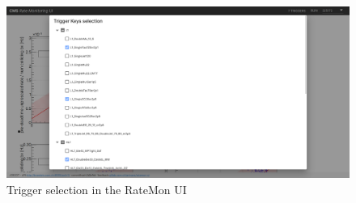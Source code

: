 \begin{figure}
    \centerline{
        \includegraphics[width=0.9\paperwidth]{figures/ratemon-ui1.png}}
    \caption{Trigger selection in the RateMon UI}
    \label{fig:ratemon_ui0}
\end{figure}